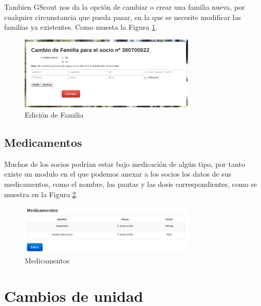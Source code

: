 Tambien GScout nos da la opción de cambiar o crear una familia nueva, por cualquier circunstancia que pueda pasar, en la que se necesite modificar las familias ya existentes.
Como muesta la Figura \ref{fig:edit_familia}.\\

\begin{figure}[H]
\begin{center}
\includegraphics[width=0.75\textwidth]{images/cambio_familia.jpg}
\caption{Edición de Familia}
\label{fig:edit_familia}
\end{center}
\end{figure}


\subsection{Medicamentos}

Muchos de los socios podrían estar bajo medicación de algún tipo, por tanto existe un modulo en el que podemos anexar a los socios los datos de sus medicamentos, como el nombre, las pautas y las dosis correspondientes, 
como se muestra en la Figura \ref{fig:medicamentos}.\\

\begin{figure}[H]
\begin{center}
\includegraphics[width=0.75\textwidth]{images/medicamentos.jpg}
\caption{Medicamentos}
\label{fig:medicamentos}
\end{center}
\end{figure}

\section{Cambios de unidad}
\label{3:sec3}

